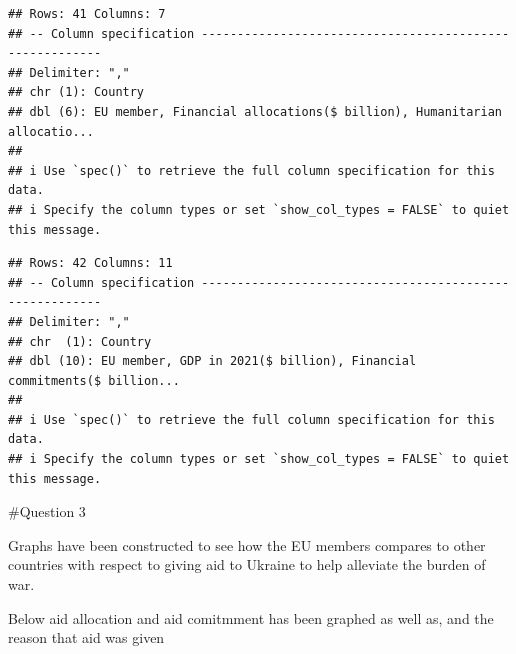 \documentclass[11pt,preprint, authoryear]{elsarticle}
\numberwithin{equation}{section}
\numberwithin{figure}{section}
\numberwithin{table}{section}
\begin{document}
\begin{Shaded}
\begin{Highlighting}[]
\OtherTok{\textless{}{-}} \NormalTok{(}\NormalTok{)}
\end{Highlighting}
\end{Shaded}

\begin{verbatim}
## Rows: 41 Columns: 7
## -- Column specification --------------------------------------------------------
## Delimiter: ","
## chr (1): Country
## dbl (6): EU member, Financial allocations($ billion), Humanitarian allocatio...
## 
## i Use `spec()` to retrieve the full column specification for this data.
## i Specify the column types or set `show_col_types = FALSE` to quiet this message.
\end{verbatim}

\begin{Shaded}
\begin{Highlighting}[]
\OtherTok{\textless{}{-}} \NormalTok{(}\NormalTok{)}
\end{Highlighting}
\end{Shaded}

\begin{verbatim}
## Rows: 42 Columns: 11
## -- Column specification --------------------------------------------------------
## Delimiter: ","
## chr  (1): Country
## dbl (10): EU member, GDP in 2021($ billion), Financial commitments($ billion...
## 
## i Use `spec()` to retrieve the full column specification for this data.
## i Specify the column types or set `show_col_types = FALSE` to quiet this message.
\end{verbatim}

\#Question 3

Graphs have been constructed to see how the EU members compares to other
countries with respect to giving aid to Ukraine to help alleviate the
burden of war.

Below aid allocation and aid comitmment has been graphed as well as, and
the reason that aid was given

\begin{Shaded}
\begin{Highlighting}[]
\OtherTok{\textless{}{-}} 
\end{Highlighting}
\end{Shaded}
\end{document}
